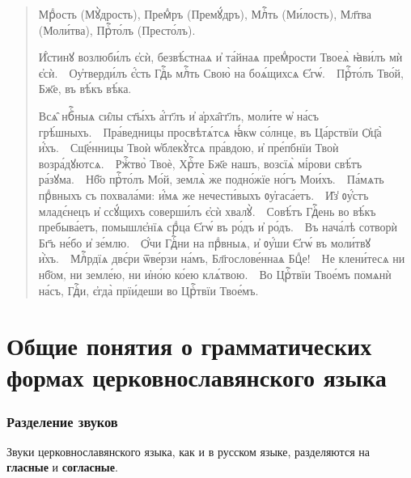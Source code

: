 \documentclass[11pt,a4paper,oneside]{memoir}
\newcommand{\exquote}{quote}
\newcommand{\pstyle}{\textenglish}
\newcommand{\pxp}[1]{\pstyle{(}#1\pstyle{)}}
\newcommand{\sdash}{\textenglish{\textemdash}}
\begin{document}
        \begin{\exquote}
          \begin{slv}
            Мрⷣость \pxp{Мꙋ̀дрость}, Премⷣръ \pxp{Премꙋ́дръ}, Млⷭ҇ть
            \pxp{Ми́лость}, Мл҃тва \pxp{Моли́тва}, Прⷭ҇то́лъ \pxp{Престо́лъ}.

            И҆́стинꙋ возлюби́лъ є҆сѝ, безвѣ́стнаѧ и҆ та́йнаѧ
            премⷣрости Твоеѧ̀ ꙗ҆ви́лъ мѝ є҆сѝ.~\sdash~Оу҆тверди́лъ
            є҆́сть Гдⷭ҇ь млⷭ҇ть Свою̀ на боѧ́щихсѧ
            Є҆гѡ́.~\sdash~Прⷭ҇то́лъ Тво́й, Бж҃е, въ вѣ́къ вѣ́ка.

            Всѧ̑ нбⷭ҇ныѧ си̑лы ст҃ы́хъ а҆́гг҃лъ и҆ а҆рха̑гг҃лъ,
            моли́те ѡ҆ на́съ грѣ́шныхъ.~\sdash~Пра́ведницы
            просвѣтѧ́тсѧ ꙗ҆́кѡ со́лнце, въ Ца́рствїи Ѻ҆ц҃а̀
            и҆́хъ.~\sdash~Сщ҃е́нницы Твоѝ ѡ҆блекꙋ̀тсѧ пра́вдою, и҆
            пре́пбнїи Твоѝ возра́дꙋютсѧ.~\sdash~Ржⷭ҇тво̀ Твоѐ,
            Хрⷭ҇те Бж҃е нашъ, возсїѧ̀ мі́рови свѣ́тъ
            ра́зꙋма.~\sdash~Нб҃о прⷭ҇то́лъ Мо́й, землѧ̀ же подно́жїе
            но́гъ Мои́хъ.~\sdash~Па́мѧть прⷣвныхъ съ похвала́ми:
            и҆́мѧ же нечести́выхъ ᲂу҆гаса́етъ.~\sdash~И̑з̾ ᲂу҆́стъ
            младє́нецъ и҆ ссꙋ́щихъ соверши́лъ є҆сѝ
            хвалꙋ̀.~\sdash~Совѣ́тъ Гдⷭ҇ень во вѣ́къ пребыва́етъ,
            помышлє҆нїѧ срⷣца Є҆гѡ́ въ ро́дъ и҆ ро́дъ.~\sdash~Въ
            нача́лѣ сотворѝ Бг҃ъ не́бо и҆ зе́млю.~\sdash~Ѻ҆́чи
            Гдⷭ҇ни на прⷣвныѧ, и҆ ᲂу҆́ши Є҆гѡ́ въ моли́твꙋ
            и҆̀хъ.~\sdash~Млⷭ҇рдїѧ двє́ри ѿве́рзи на́мъ,
            Бл҃гослове́ннаѧ Бцⷣе!~\sdash~Не клени́тесѧ ни нб҃ом, ни
            земле́ю, ни и҆но́ю ко́ею клѧ́твою.~\sdash~Во Црⷭ҇твїи
            Твое́мъ помѧнѝ на́съ, Гдⷭ҇и, є҆гда̀ прїи́деши во
            Црⷭ҇твїи Твое́мъ.
          \end{slv}
        \end{\exquote}
        \pagebreak

        \section[Общие понятия о грамматических формах]{Общие понятия
        о грамматических формах церковнославянского языка}
        \subsubsection{Разделение звуков}

        \medskip
        Звуки церковнославянского языка, как и в русском языке,
        разделяются на \textbf{гласные} и \textbf{согласные}.
        \bigskip
\end{document}
